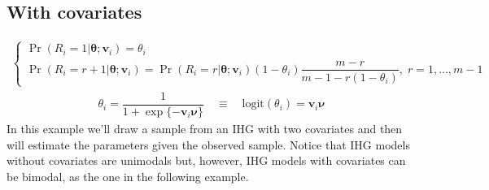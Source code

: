 \documentclass[letterpaper,10pt,english]{sphinxmanual}
\begin{document}
\subsection{With covariates}
\label{\detokenize{manual:ihg-with-covariates}}\label{\detokenize{manual:id37}}
\sphinxAtStartPar
{}
\begin{equation*}
\begin{split}\left\{
\begin{array}{l}
    \Pr(R_i=1|\pmb\theta;\pmb v_i) = \theta_i
    \\
    \Pr(R_i=r+1|\pmb\theta;\pmb v_i) = \Pr(R_i=r|\pmb\theta;\pmb v_i)(1-\theta_i)\dfrac{m-r}{m-1-r(1-\theta_i)},\; r= 1, \ldots, m-1
\end{array}
\right.\end{split}
\end{equation*}\begin{equation*}
\begin{split}\theta_i = \dfrac{1}{1 + \exp\{ - \pmb v_i \pmb \nu \}}
\quad \equiv \quad
\mathrm{logit}(\theta_i) = \pmb v_i \pmb \nu\end{split}
\end{equation*}
\sphinxAtStartPar
In this example we’ll draw a sample from an IHG with two covariates
and then will estimate the parameters given the observed sample.
Notice that IHG models without covariates are unimodals but, however,
IHG models with covariates can be bimodal, as the one in the following example.
\def\sphinxLiteralBlockLabel{\label{\detokenize{manual:id61}}}
\end{document}
